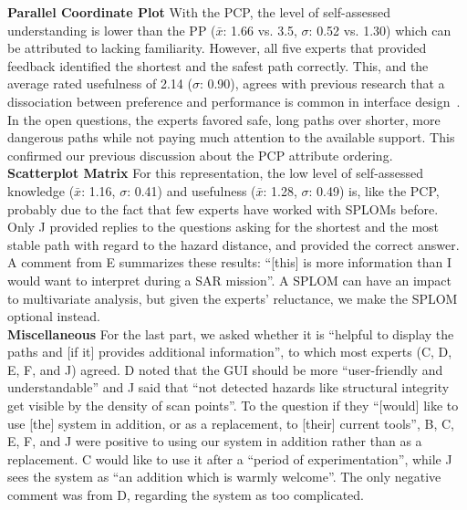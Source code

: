\documentclass{egpubl}
\begin{document}
%
\textbf{Parallel Coordinate Plot} With the PCP, the level of self-assessed understanding is lower than the PP ($\bar{x}$: 1.66 vs. 3.5, $\sigma$: 0.52 vs. 1.30) which can be attributed to lacking familiarity. However, all five experts that provided feedback identified the shortest and the safest path correctly. This, and the average rated usefulness of 2.14 ($\sigma$: 0.90), agrees with previous research that a dissociation between preference and performance is common in interface design~\cite{andre1995users}. In the open questions, the experts favored safe, long paths over shorter, more dangerous paths while not paying much attention to the available support. This confirmed our previous discussion about the PCP attribute ordering.\\
%
\textbf{Scatterplot Matrix} For this representation, the low level of self-assessed knowledge ($\bar{x}$: 1.16, $\sigma$: 0.41) and usefulness ($\bar{x}$: 1.28, $\sigma$: 0.49) is, like the PCP, probably due to the fact that few experts have worked with SPLOMs before. Only J provided replies to the questions asking for the shortest and the most stable path with regard to the hazard distance, and provided the correct answer. A comment from E summarizes these results: ``[this] is more information than I would want to interpret during a SAR mission''. A SPLOM can have an impact to multivariate analysis, but given the experts' reluctance, we make the SPLOM optional instead.\\
%
\noindent \textbf{Miscellaneous} For the last part, we asked whether it is ``helpful to display the paths and [if it] provides additional information'', to which most experts (C, D, E, F, and J) agreed. D noted that the GUI should be more ``user-friendly and understandable'' and J said that ``not detected hazards like structural integrity get visible by the density of scan points''. To the question if they ``[would] like to use [the] system in addition, or as a replacement, to [their] current tools'', B, C, E, F, and J were positive to using our system in addition rather than as a replacement. C would like to use it after a ``period of experimentation'', while J sees the system as ``an addition which is warmly welcome''. The only negative comment was from D, regarding the system as too complicated. %
\end{document}

